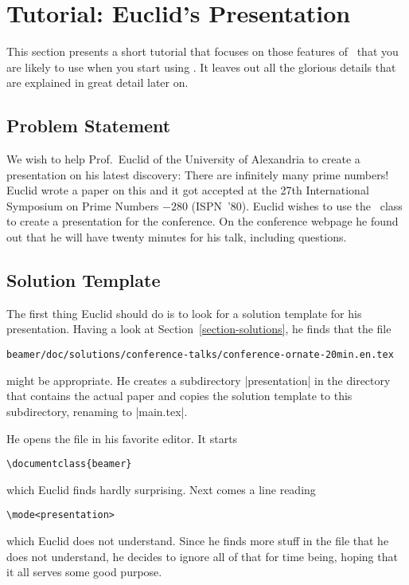 %
%
%

\section{Tutorial: Euclid's Presentation}
\label{section-tutorial}

This section presents a short tutorial that focuses on those features of \beamer\ that you are likely to use when you start using \beamer. It  leaves out all the glorious details that are explained in great detail later on.


\subsection{Problem Statement}

We wish to help Prof.\ Euclid of the University of Alexandria to create a presentation on his latest discovery: There are infinitely many prime numbers! Euclid wrote a paper on this and it got accepted at the 27th International Symposium on Prime Numbers $-280$ (ISPN~'80). Euclid wishes to use the \beamer\ class to create a presentation for the conference. On the conference webpage he found out that he will have twenty minutes for his talk, including questions.


\subsection{Solution Template}

The first thing Euclid should do is to look for a solution template for his presentation. Having a look at Section~\ref{section-solutions}, he finds that the file
\begin{verbatim}
beamer/doc/solutions/conference-talks/conference-ornate-20min.en.tex
\end{verbatim}
might be appropriate. He creates a subdirectory |presentation| in the directory that contains the actual paper and copies the solution template to this subdirectory, renaming to |main.tex|.

He opens the file in his favorite editor. It starts
\begin{verbatim}
\documentclass{beamer}
\end{verbatim}
which Euclid finds hardly surprising. Next comes a line reading
\begin{Verbatim}
\mode<presentation>
\end{Verbatim}
which Euclid does not understand. Since he finds more stuff in the file that he does not understand, he decides to ignore all of that for time being, hoping that it all serves some good purpose.


